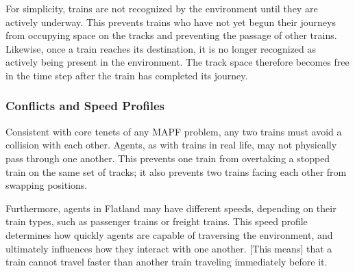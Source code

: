 \documentclass[11pt]{article}
\begin{document}
For simplicity, trains are not recognized by the environment until they are actively underway.  This prevents trains who have not yet begun their journeys from occupying space on the tracks and preventing the passage of other trains.  Likewise, once a train reaches its destination, it is no longer recognized as actively being present in the environment.  The track space therefore becomes free in the time step after the train has completed its journey.

\subsubsection{Conflicts and Speed Profiles}
\label{sec:Conflicts}
Consistent with core tenets of any MAPF problem, any two trains must avoid a collision with each other.  Agents, as with trains in real life, may not physically pass through one another.  This prevents one train from overtaking a stopped train on the same set of tracks; it also prevents two trains facing each other from swapping positions.

Furthermore, agents in Flatland may have different speeds, depending on their train types, such as passenger trains or freight trains.  This speed profile determines how quickly agents are capable of traversing the environment, and ultimately influences how they interact with one another.  [This means] that a train cannot travel faster than another train traveling immediately before it.





\end{document}
